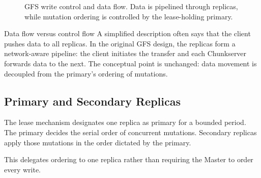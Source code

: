 \documentclass[11pt,a4paper,oneside]{book}
\begin{document}
\begin{figure}[htbp]
\centering
{}
\caption{GFS write control and data flow. Data is pipelined through replicas, while mutation ordering is controlled by the lease-holding primary.}
\label{fig:gfs-write}
\end{figure}

\begin{remarkbox}{Data flow versus control flow}
A simplified description often says that the client pushes data to all replicas. In the original GFS design, the replicas form a network-aware pipeline: the client initiates the transfer and each Chunkserver forwards data to the next. The conceptual point is unchanged: data movement is decoupled from the primary's ordering of mutations.
\end{remarkbox}

\subsection{Primary and Secondary Replicas}

The lease mechanism designates one replica as primary for a bounded period. The primary decides the serial order of concurrent mutations. Secondary replicas apply those mutations in the order dictated by the primary.

This delegates ordering to one replica rather than requiring the Master to order every write.
\end{document}
